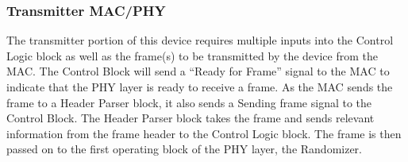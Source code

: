 \documentclass[10pt]{article}
\begin{document}
\subsubsection{Transmitter MAC/PHY}
The transmitter portion of this device requires multiple inputs into the Control Logic block as well as the frame(s) to be transmitted by the device from the MAC. 
The Control Block will send a “Ready for Frame” signal to the MAC to indicate that the PHY layer is ready to receive a frame. As the MAC sends the frame to a Header Parser block, it also sends a Sending frame signal to the Control Block. The Header Parser block takes the frame and sends relevant information from the frame header to the Control Logic block. The frame is then passed on to the first operating block of the PHY layer, the Randomizer.  
\end{document}

